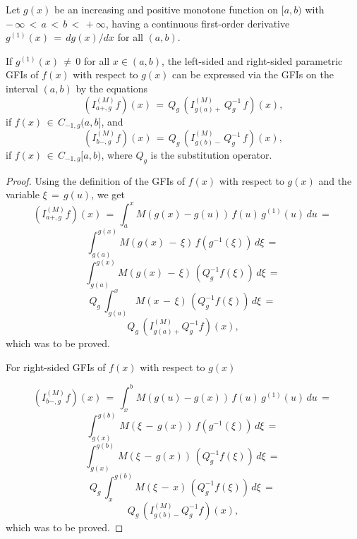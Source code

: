 \documentclass[10pt,a4paper]{amsart}
\begin{document}
\begin{Proposition} \label{PGFI-GFIab}
Let $g(x)$ be an increasing and positive monotone function on $[a, b)$ 
with $ - \, \infty \, < \, a \, < \, b \, < \, +\infty$, 
having a continuous first-order derivative $g^{(1)}(x) \, = \, dg(x)/dx$ for all $(a,b)$.

If $g^{(1)}(x) \, \ne \, 0$ for all $x \in (a,b)$,
the left-sided and right-sided parametric GFIs of $f(x)$ with respect to $g(x)$ can be expressed via 
the GFIs on the interval $(a,b)$ by the equations
\begin{equation} \label{I-QIQ-l}
(I^{(M)}_{a+,g} f)(x) \, = \, 
Q_{g} \, (I^{(M)}_{g(a)+} \, Q^{-1}_g \, f)(x) ,
\end{equation}
if $f(x) \, \in \,C_{-1,g}(a,b]$, and
\begin{equation} \label{I-QIQ-r}
(I^{(M)}_{b-,g} f)(x) \, = \, 
Q_{g} \, (I^{(M)}_{g(b)-} \, Q^{-1}_g \, f)(x) ,
\end{equation}
if $f(x) \, \in \, C_{-1,g}[a,b)$, 
where $Q_g$ is the substitution operator.

\end{Proposition}

\begin{proof}

Using the definition of the GFIs of $f(x)$ with respect to $g(x)$
and the variable $\xi \, = \, g(u)$, we get
\[
(I^{(M)}_{a+,g} f)(x) \, = \, 
\int^x_a M(g(x)-g(u)) \, f(u) \, g^{(1)}(u) \, du 
\, = \, 
\]
\[
\int^{g(x)}_{g(a)} M(g(x) \, - \, \xi) \, 
f(g^{-1}(\xi)) \, d \xi 
\, = \, 
\]
\[
\int^{g(x)}_{g(a)} M(g(x) \, - \, \xi) \, 
(Q^{-1}_g f(\xi)) \, d \xi 
\, = \, 
\]
\[
Q_{g} \, \int^{x}_{g(a)} M(x \, - \, \xi) \, 
(Q^{-1}_g f(\xi)) \, d \xi 
\, = \, 
\]
\[
Q_{g} \, (I^{(M)}_{g(a)+} Q^{-1}_g f)(x) ,
\]
which was to be proved. 

For right-sided GFIs of $f(x)$ with respect to $g(x)$

\[
(I^{(M)}_{b-,g} f)(x) \, = \, 
\int^b_x M(g(u)-g(x)) \, f(u) \, g^{(1)}(u) \, du 
\, = \, 
\]
\[
\int^{g(b)}_{g(x)} M(\xi \, - \, g(x)) \, 
f(g^{-1}(\xi)) \, d \xi 
\, = \, 
\]
\[
\int^{g(b)}_{g(x)}M(\xi \, - \, g(x)) \, 
(Q^{-1}_g f(\xi)) \, d \xi 
\, = \, 
\]
\[
Q_{g} \, \int^{g(b)}_{x} M(\xi \, - \, x) \, 
(Q^{-1}_g f(\xi)) \, d \xi 
\, = \, 
\]
\[
Q_{g} \, (I^{(M)}_{g(b)-} Q^{-1}_g f)(x) ,
\]
which was to be proved. 


\end{proof}
\end{document}
